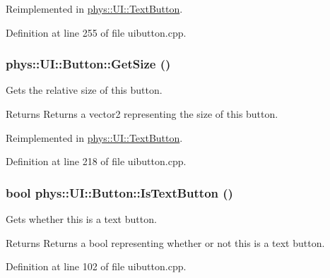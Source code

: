 Reimplemented in \hyperlink{classphys_1_1UI_1_1TextButton_ad339621af6e73ff9702c0dd4cdadbb73}{phys::UI::TextButton}.



Definition at line 255 of file uibutton.cpp.

\hypertarget{classphys_1_1UI_1_1Button_ade75e042d1a19be5d4fb1b16913af5a5}{
\subsubsection[{GetSize}]{ phys::UI::Button::GetSize ()}}
\label{d8/d88/classphys_1_1UI_1_1Button_ade75e042d1a19be5d4fb1b16913af5a5}


Gets the relative size of this button. 

\begin{DoxyReturn}{Returns}
Returns a vector2 representing the size of this button. 
\end{DoxyReturn}


Reimplemented in \hyperlink{classphys_1_1UI_1_1TextButton_a21f1ff24070711e5a42eae4eb54d02d6}{phys::UI::TextButton}.



Definition at line 218 of file uibutton.cpp.

\hypertarget{classphys_1_1UI_1_1Button_a9c575f6433a5a455dc8c5de73d37839c}{
\subsubsection[{IsTextButton}]{\setlength{\rightskip}{0pt plus 5cm}bool phys::UI::Button::IsTextButton ()}}
\label{d8/d88/classphys_1_1UI_1_1Button_a9c575f6433a5a455dc8c5de73d37839c}


Gets whether this is a text button. 

\begin{DoxyReturn}{Returns}
Returns a bool representing whether or not this is a text button. 
\end{DoxyReturn}


Definition at line 102 of file uibutton.cpp.

